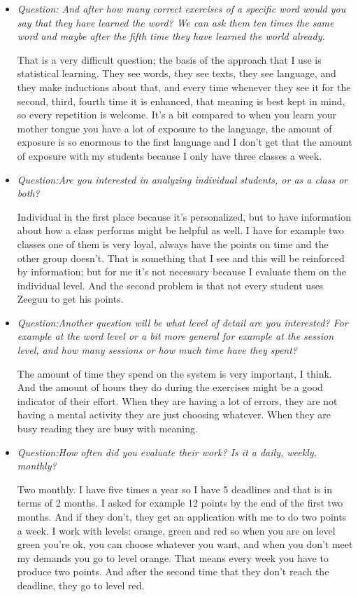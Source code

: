 \begin{itemize}
	\item \textit{Question: And after how many correct exercises of a specific word would you say that they have learned the word? We can ask them ten times the same word and maybe after the fifth time they have learned the world already.}
	
That is a very difficult question; the basis of the approach that I use is statistical learning. They see words, they see texts, they see language, and they make inductions about that, and every time whenever they see it for the second, third, fourth time it is enhanced, that meaning is best kept in mind, so every repetition is welcome.
It's a bit compared to when you learn your mother tongue you have a lot of exposure to the language, the amount of exposure is so enormous to the first language and I don't get that the amount of exposure with my students because I only have three classes a week.

	\item \textit{Question:Are you interested in analyzing individual students, or as a class or both?}
	
Individual in the first place because it's personalized, but to have information about how a class performs might be helpful as well.
I have for example two classes one of them is very loyal, always have the points on time and the other group doesn't. That is something that I see and this will be reinforced by information; but for me it's not necessary because I evaluate them on the individual level. 
And the second problem is that not every student uses Zeeguu to get his points.

	\item \textit{Question:Another question will be what level of detail are you interested? For example at the word level or a bit more general for example at the session level, and how many sessions or how much time have they spent? }
	
The amount of time they spend on the system is very important, I think. 
And the amount of hours they do during the exercises might be a good indicator of their effort. When they are having a lot of errors, they are not having a mental activity they are just choosing whatever. When they are busy reading they are busy with meaning. 

	\item \textit{Question:How often did you evaluate their work? Is it a daily, weekly, monthly?}
	
Two monthly. I have five times a year so I have 5 deadlines and that is in terms of 2 months. I asked for example 12 points by the end of the first two months. And if they don't, they get an application with me to do two points a week. I work with levels: orange, green and red so when you are on level green you're ok, you can choose whatever you want, and when you don't meet my demands you go to level orange. That means every week you have to produce two points. And after the second time that they don't reach the deadline, they go to level red.


\end{itemize}
